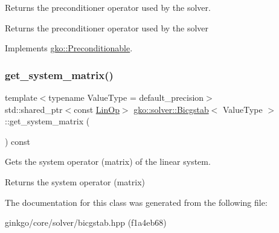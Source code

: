 Returns the preconditioner operator used by the solver. 

\begin{DoxyReturn}{Returns}
the preconditioner operator used by the solver 
\end{DoxyReturn}


Implements \hyperlink{classgko_1_1Preconditionable_ad9545089aef0dfc83bc7a74e5bf1d748}{gko\+::\+Preconditionable}.

\mbox{\label{classgko_1_1solver_1_1Bicgstab_ada73e8ca3e8924011c8780cab92f651e}} 
\subsubsection{\texorpdfstring{get\+\_\+system\+\_\+matrix()}{get\_system\_matrix()}}
{\footnotesize\ttfamily template$<$typename Value\+Type  = default\+\_\+precision$>$ \\
std\+::shared\+\_\+ptr$<$const \hyperlink{classgko_1_1LinOp}{Lin\+Op}$>$ \hyperlink{classgko_1_1solver_1_1Bicgstab}{gko\+::solver\+::\+Bicgstab}$<$ Value\+Type $>$\+::get\+\_\+system\+\_\+matrix (\begin{DoxyParamCaption}{ }\end{DoxyParamCaption}) const\hspace{0.3cm}{\ttfamily [inline]}}



Gets the system operator (matrix) of the linear system. 

\begin{DoxyReturn}{Returns}
the system operator (matrix) 
\end{DoxyReturn}


The documentation for this class was generated from the following file\+:\begin{DoxyCompactItemize}
\item 
ginkgo/core/solver/bicgstab.\+hpp (f1a4eb68)\end{DoxyCompactItemize}
